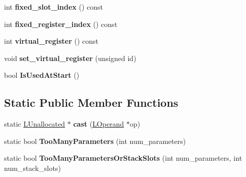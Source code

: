 \begin{DoxyCompactItemize}
\item 
int {\bfseries fixed\+\_\+slot\+\_\+index} () const \hypertarget{classv8_1_1internal_1_1_l_unallocated_a471c6223bc3c6acdb3946a4d0a4e60e9}{}\label{classv8_1_1internal_1_1_l_unallocated_a471c6223bc3c6acdb3946a4d0a4e60e9}

\item 
int {\bfseries fixed\+\_\+register\+\_\+index} () const \hypertarget{classv8_1_1internal_1_1_l_unallocated_acfb9b54832a88c3d8c00c74d16b5eb5f}{}\label{classv8_1_1internal_1_1_l_unallocated_acfb9b54832a88c3d8c00c74d16b5eb5f}

\item 
int {\bfseries virtual\+\_\+register} () const \hypertarget{classv8_1_1internal_1_1_l_unallocated_aed931ce6fac8adfed1f654b707481594}{}\label{classv8_1_1internal_1_1_l_unallocated_aed931ce6fac8adfed1f654b707481594}

\item 
void {\bfseries set\+\_\+virtual\+\_\+register} (unsigned id)\hypertarget{classv8_1_1internal_1_1_l_unallocated_a566b6b30c5379f4223e4d2bb3b78e5b3}{}\label{classv8_1_1internal_1_1_l_unallocated_a566b6b30c5379f4223e4d2bb3b78e5b3}

\item 
bool {\bfseries Is\+Used\+At\+Start} ()\hypertarget{classv8_1_1internal_1_1_l_unallocated_ae8f5b965f80d608b35b91df5412d775f}{}\label{classv8_1_1internal_1_1_l_unallocated_ae8f5b965f80d608b35b91df5412d775f}

\end{DoxyCompactItemize}
\subsection*{Static Public Member Functions}
\begin{DoxyCompactItemize}
\item 
static \hyperlink{classv8_1_1internal_1_1_l_unallocated}{L\+Unallocated} $\ast$ {\bfseries cast} (\hyperlink{classv8_1_1internal_1_1_l_operand}{L\+Operand} $\ast$op)\hypertarget{classv8_1_1internal_1_1_l_unallocated_a1e14abbf5d697fe326914134e8eee8a8}{}\label{classv8_1_1internal_1_1_l_unallocated_a1e14abbf5d697fe326914134e8eee8a8}

\item 
static bool {\bfseries Too\+Many\+Parameters} (int num\+\_\+parameters)\hypertarget{classv8_1_1internal_1_1_l_unallocated_a12e3ad4ed8973d59e3e73a4c0b35761c}{}\label{classv8_1_1internal_1_1_l_unallocated_a12e3ad4ed8973d59e3e73a4c0b35761c}

\item 
static bool {\bfseries Too\+Many\+Parameters\+Or\+Stack\+Slots} (int num\+\_\+parameters, int num\+\_\+stack\+\_\+slots)\hypertarget{classv8_1_1internal_1_1_l_unallocated_a0d76d8762d87465679bbe8414da9e60c}{}\label{classv8_1_1internal_1_1_l_unallocated_a0d76d8762d87465679bbe8414da9e60c}

\end{DoxyCompactItemize}
